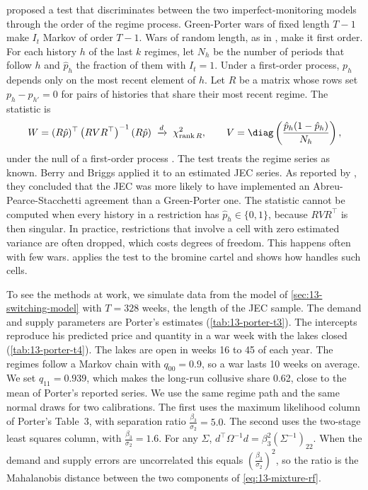  proposed a test that discriminates between the two imperfect-monitoring models through the
order of the regime process. Green-Porter wars of fixed length $T-1$ make $I_t$ Markov of order $T-1$. Wars of random
length, as in \citet{AbreuPearceStacchetti1986}, make it first order. For each history $h$ of the last $k$ regimes,
let $N_h$ be the number of periods that follow $h$ and $\hat p_h$ the fraction of them with $I_t = 1$. Under a
first-order process, $p_h$ depends only on the most recent element of $h$. Let $R$ be a matrix whose rows set
$p_h - p_{h'} = 0$ for pairs of histories that share their most recent regime. The statistic is
\begin{equation}\label{eq:13-bb-test}
  W = (R\hat p)^\top\left(RVR^\top\right)^{-1}(R\hat p) \;\xrightarrow{d}\; \chi^2_{\mathrm{rank}\,R}, \qquad
  V = \diag\left(\frac{\hat p_h(1 - \hat p_h)}{N_h}\right),
\end{equation}
under the null of a first-order process \citep[WP fn.~36]{Levenstein1997}. The test treats the regime series as
known. Berry and Briggs applied it to an estimated JEC series. As reported by \citet[WP p.~16]{Levenstein1997}, they
concluded that the JEC was more likely to have implemented an Abreu-Pearce-Stacchetti agreement than a Green-Porter
one. The statistic cannot be computed when every history in a restriction has $\hat p_h \in \{0,1\}$, because
$RVR^\top$ is then singular. In practice, restrictions that involve a cell with zero estimated variance are often
dropped, which costs degrees of freedom. This happens often with few wars.  applies the test to
the bromine cartel and shows how \citet{Levenstein1997} handles such cells.

To see the methods at work, we simulate data from the model of \cref{sec:13-switching-model} with $T = 328$ weeks,
the length of the JEC sample. The demand and supply parameters are Porter's estimates (\cref{tab:13-porter-t3}). The
intercepts reproduce his predicted price and quantity in a war week with the lakes closed (\cref{tab:13-porter-t4}).
The lakes are open in weeks 16 to 45 of each year. The regimes follow a Markov chain with $q_{00} = 0.9$, so a war
lasts 10 weeks on average. We set $q_{11} = 0.939$, which makes the long-run collusive share 0.62, close to the mean
of Porter's reported series. We use the same regime path and the same normal draws for two calibrations. The first uses
the maximum likelihood column of Porter's Table~3, with separation ratio $\frac{\beta_3}{\sigma_2} = 5.0$. The second
uses the two-stage least squares column, with $\frac{\beta_3}{\sigma_2} = 1.6$. For any $\Sigma$,
$d^\top\Omega^{-1}d = \beta_3^2(\Sigma^{-1})_{22}$. When the demand and supply errors are uncorrelated this equals
$(\frac{\beta_3}{\sigma_2})^2$, so the ratio is the Mahalanobis distance between the two components of
\eqref{eq:13-mixture-rf}.

